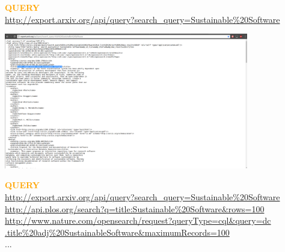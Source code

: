 \documentclass{beamer}
\begin{document}
\begin{frame}[fragile]
    \centering
    \textcolor{orange}{\textbf{QUERY}} \\
    \vspace{3mm}
    \small{\url{http://export.arxiv.org/api/query?search_query=Sustainable%20Software}} \\
\end{frame}

\begin{frame}
\begin{center}
    \includegraphics[width=0.8\textwidth]{static/arxiv_api_result.png}
\end{center}
\end{frame}

\begin{frame}[fragile]
    \begin{center}
    \textcolor{orange}{\textbf{QUERY}} \\
    \vspace{3mm}
    \small{\url{http://export.arxiv.org/api/query?search_query=Sustainable%20Software}} \\
    \pause
    \vspace{10mm}
    \small{\url{http://api.plos.org/search?q=title:Sustainable%20Software&rows=100}} \\
    \pause
    \vspace{10mm}
    \small{\url{http://www.nature.com/opensearch/request?queryType=cql&query=dc
    .title%
    \small{...}
    \end{center}
\end{frame}

\begin{frame}
    \begin{center}
    
    \end{center}
\end{frame}
\end{document}
